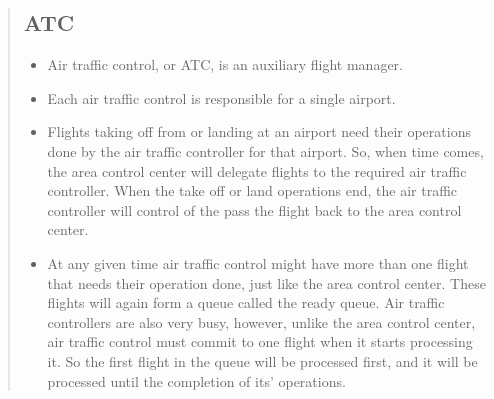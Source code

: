 \documentclass[10pt]{article}
\begin{document}
\begin{quote}
\begin{center}
\end{center}


\subsection{\large\textbf{ATC}}

    \begin{itemize} 
    
    \item Air traffic control, or ATC, is an auxiliary flight manager. 
    
    \item Each air traffic control is responsible for a single airport. 
        
    \item Flights taking off from or landing at an airport need their operations done by the air traffic controller for that airport. So, when time comes, the area control center will delegate flights to the required air traffic controller. When the take off or land operations end, the air traffic controller will control of the pass the flight back to the area control center. 
    
    \item At any given time air traffic control might have more than one flight that needs their operation done, just like the area control center. These flights will again form a queue called the ready queue. Air traffic controllers are also very busy, however, unlike the area control center, air traffic control must commit to one flight when it starts processing it. So the first flight in the queue will be processed first, and it will be processed until the completion of its' operations. 
    

\end{itemize}
\end{quote}
\end{document}
